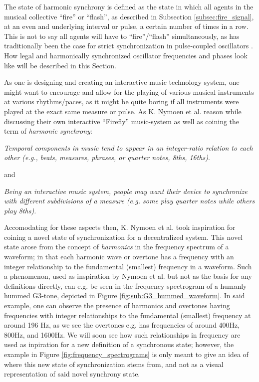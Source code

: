 The state of harmonic synchrony is defined \cite{nymoen_synch} as the state in which all agents in the musical collective ``fire'' or ``flash'', as described in Subsection \ref{subsec:fire_signal}, at an even and underlying interval or pulse, a certain number of times in a row. This is not to say all agents will have to ``fire''/``flash'' simultaneously, as has traditionally been the case for strict synchronization in pulse-coupled oscillators \cite{}. How legal and harmonically synchronized oscillator frequencies and phases look like will be described in this Section.

As one is designing and creating an interactive music technology system, one might want to encourage and allow for the playing of various musical instruments at various rhythms/paces, as it might be quite boring if all instruments were played at the exact same measure or pulse. As K. Nymoen et al. \cite{nymoen_synch} reason while discussing their own interactive ``Firefly'' music-system as well as coining the term of \textit{harmonic synchrony}: \nl

\textit{Temporal components in music tend to appear in an integer-ratio relation to each other (e.g., beats, measures, phrases, or quarter notes, 8ths, 16ths)}. \nl

and \nl

\textit{Being an interactive music system, people may want their device to synchronize with different subdivisions of a measure (e.g. some play quarter notes while others play 8ths).} \nl

Accomodating for these aspects then, K. Nymoen et al. took inspiration for coining a novel state of synchronization for a decentralized system. This novel state arose from the concept of \textit{harmonics} in the frequency spectrum of a waveform; in that each harmonic wave or overtone has a frequency with an integer relationship to the fundamental (smallest) frequency in a waveform. Such a phenomenon, used as inspiration by Nymoen et al. but not as the basis for any definitions directly, can e.g. be seen in the frequency spectrogram of a humanly hummed G3-tone, depicted in Figure \ref{fig:sub:G3_hummed_waveform}. In said example, one can observe the presence of harmonics and overtones having frequencies with integer relationships to the fundamental (smallest) frequency at around 196 Hz, as we see the overtones e.g. has frequencies of around 400Hz, 800Hz, and 1600Hz. We will soon see how such relationships in frequency are used as inpiration for a new definition of a synchronous state; however, the example in Figure \ref{fig:frequency_spectrograms} is only meant to give an idea of where this new state of synchronization stems from, and not as a visual representation of said novel synchrony state.

